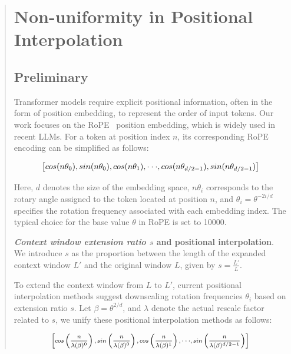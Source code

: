 \begin{abstract}
\section{Non-uniformity in Positional Interpolation}
\label{sec:analysis}

\subsection{Preliminary}

Transformer models require explicit positional information, often in the form of position embedding, to represent the order of input tokens. Our work focuses on the RoPE~\cite{rope} position embedding, which is widely used in recent  LLMs. For a token at position index $n$, its corresponding RoPE encoding can be simplified as follows:

\begin{equation}
		\fontsize{7.8}{7.8} \selectfont
	\label{eq:rope}
	\left[ cos(n\theta_0), sin(n\theta_0), cos(n\theta_1), \cdot\cdot\cdot, cos(n\theta_{d/2-1}), sin(n\theta_{d/2-1}) \right]   
\end{equation}

Here, $d$ denotes the size of the embedding space, 
$n\theta_i$ corresponds to the rotary angle assigned to the token located at position $n$, 
and $\theta_i=\theta^{-2i/d}$ specifies the rotation frequency associated with each embedding index. The typical choice for the base value $\theta$ in RoPE is set to 10000.

\textbf{\emph{Context window extension ratio $s$} and positional interpolation}. We introduce $s$ as the proportion between the length of the expanded context window $L'$ and the original window $L$, given by $s=\frac{L'}{L}$.

To extend the context window from $L$ to $L'$, current positional interpolation methods suggest downscaling rotation frequencies $\theta_i$ based on extension ratio $s$. Let $\beta=\theta^{2/d}$, and $\lambda$ denote the actual rescale factor related to $s$, we   unify these positional interpolation methods as follows:

\begin{equation}	
	\fontsize{7.5}{7.5} \selectfont
	\label{eq:unified_rope}
	\begin{aligned}
		\left[cos\left(\frac{n}{\lambda(\beta)^0}\right), sin \left(\frac{n}{\lambda(\beta)^0}\right), cos\left(\frac{n}{\lambda(\beta)^1}\right), \cdot\cdot\cdot,  sin \left(\frac{n}{\lambda(\beta)^{d/2-1}}\right) \right]   
	\end{aligned}
\end{equation}


\end{abstract}
